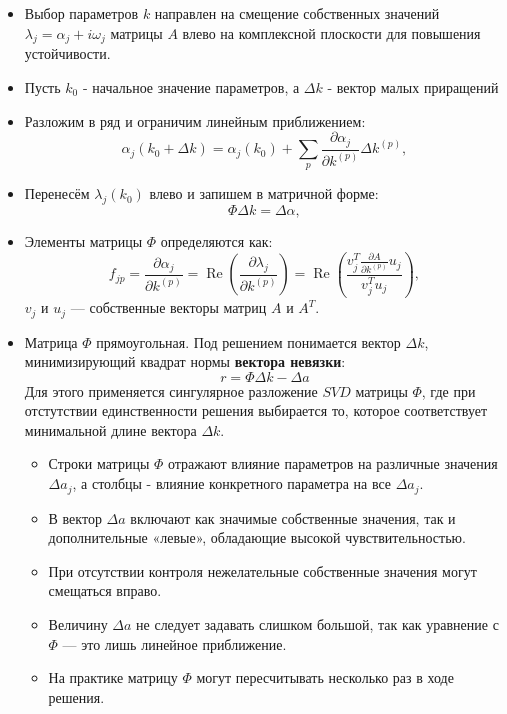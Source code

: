 	\begin{itemize}
		\item Выбор параметров \(k\) направлен на смещение собственных значений \(\lambda_j = \alpha_j + i\omega_j\) матрицы \(A\) влево на комплексной плоскости для повышения устойчивости.
		\item Пусть \(k_0\) - начальное значение параметров, а \(\Delta k\) - вектор малых приращений
		\item Разложим в ряд и ограничим линейным приближением: 
		\begin{equation}
			\alpha_j(k_0 + \Delta k) = \alpha_j(k_0) + \sum_p \frac{\partial \alpha_j}{\partial k^{(p)}} \Delta k^{(p)},
		\end{equation}
		\item Перенесём \(\lambda_j(k_0)\) влево и запишем в матричной форме:
		\begin{equation}
			\Phi \Delta k = \Delta \alpha,
		\end{equation}
		\item Элементы матрицы \(\Phi\) определяются как:
		\begin{equation}
			f_{jp} = \frac{\partial \alpha_j}{\partial k^{(p)}} = \operatorname{Re} \left( \frac{\partial \lambda_j}{\partial k^{(p)}} \right) = \operatorname{Re} \left( \frac{v_j^T \frac{\partial A}{\partial k^{(p)}} u_j}{v_j^T u_j} \right),
		\end{equation}
		\(v_j\) и \(u_j\) — собственные векторы матриц \(A\) и \(A^T\). 
		\item Матрица \(\Phi\) прямоугольная. Под решением понимается вектор \(\Delta k\), минимизирующий квадрат нормы \textbf{вектора невязки}:
		\begin{equation}
			r = \Phi \Delta k - \Delta a
		\end{equation}
		Для этого применяется сингулярное разложение \(SVD\) матрицы \(\Phi\), где при отстутствии единственности решения выбирается то, которое соответствует минимальной длине вектора \(\Delta k\).
		\begin{itemize}
			\item Строки матрицы \(\Phi\) отражают влияние параметров на различные значения \(\Delta a_j\), а столбцы - влияние конкретного параметра на все \(\Delta a_j\).
			\item В вектор \(\Delta a\) включают как значимые собственные значения, так и дополнительные 
			\newline 
			«левые», обладающие высокой чувствительностью.
			\item При отсутствии контроля нежелательные собственные значения могут смещаться вправо.
			\item Величину \(\Delta a\) не следует задавать слишком большой, так как уравнение с \(\Phi\) — это лишь линейное приближение.
			\item На практике матрицу \(\Phi\) могут пересчитывать несколько раз в ходе решения.
		\end{itemize}
	\end{itemize}
	
